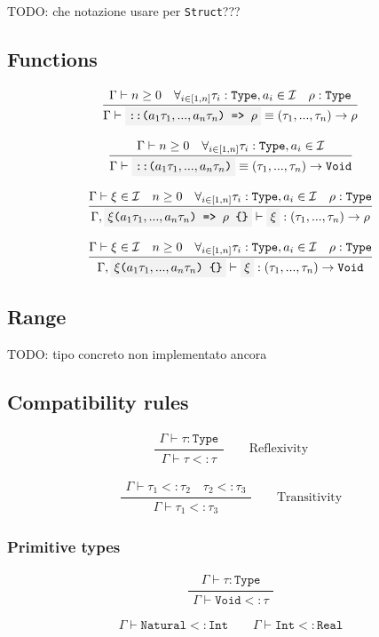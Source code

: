 \documentclass[11pt]{report}
\newcommand{\infrule}[3][gathered]{\frac{\begin{#1}#2\end{#1}}{\begin{gathered}#3\end{gathered}}}
\newcommand{\then}{\vdash}
\newcommand{\code}[1]{\texttt{\colorbox{gray!10}{#1}}}
\newcommand{\narr}{<:}
\newcommand{\Id}{\mathcal{I}}
\newcommand{\Type}{\texttt{Type}}
\newcommand{\Void}{\texttt{Void}}
\newcommand{\Int}{\texttt{Int}}
\newcommand{\Natural}{\texttt{Natural}}
\newcommand{\Real}{\texttt{Real}}
\newcommand{\Struct}{\texttt{Struct}}
\newcommand{\Env}{\Gamma}
\theoremstyle{definition}
\newcommand{\comment}[1]{
	\parbox{0.9\linewidth}{\color{black!30}\small\sffamily #1}
}
\begin{document}
\comment{TODO: che notazione usare per \Struct???}

\subsection{Functions}

\[
	\infrule{
		\Env\then n \geq 0 \quad \forall_{i\in[1,n]}{\tau_i:\Type,a_i\in\Id} \quad \rho:\Type
	}{
		\Env\then \code{::($a_1 \tau_1,...,a_n \tau_n$) => $\rho$} \equiv (\tau_1,...,\tau_n) \to \rho
	}
\]

\[
	\infrule{
		\Env\then n \geq 0 \quad \forall_{i\in[1,n]}{\tau_i:\Type,a_i\in\Id}
	}{
		\Env\then \code{::($a_1 \tau_1,...,a_n \tau_n$)} \equiv (\tau_1,...,\tau_n) \to \Void
	}
\]

\[
	\infrule{
		\Env\then \xi \in \Id \quad n \geq 0 \quad \forall_{i\in[1,n]}{\tau_i:\Type,a_i\in\Id} \quad \rho:\Type
	}{
		\Env,\code{$\xi$($a_1 \tau_1,...,a_n \tau_n$) => $\rho$ \{\}} \then \code{$\xi$} : (\tau_1,...,\tau_n) \to \rho
	}
\]

\[
	\infrule{
		\Env\then \xi \in \Id \quad n \geq 0 \quad \forall_{i\in[1,n]}{\tau_i:\Type,a_i\in\Id} \quad \rho:\Type
	}{
		\Env,\code{$\xi$($a_1 \tau_1,...,a_n \tau_n$) \{\}} \then \code{$\xi$} : (\tau_1,...,\tau_n) \to \Void
	}
\]

\subsection{Range}

\comment{TODO: tipo concreto non implementato ancora}

\subsection{Compatibility rules}

\[
	\infrule{
		\Env\then \tau:\Type
	}{
		\Env\then \tau \narr \tau
	}
	\qquad \text{Reflexivity}
\]

\[
	\infrule{
		\Env\then \tau_1 \narr \tau_2 \quad \tau_2 \narr \tau_3
	}{
		\Env\then \tau_1 \narr \tau_3
	}
	\qquad \text{Transitivity}
\]

\subsubsection{Primitive types}

\[
	\infrule{
		\Env\then \tau : \Type
	}{
		\Env\then \Void \narr \tau
	}
\]

\[
	\Env\then \Natural \narr \Int
	\qquad \Env\then \Int \narr \Real
\]
\end{document}
